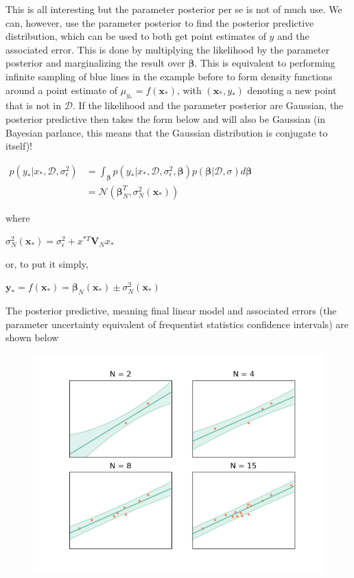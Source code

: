 \documentclass[]{article}
\begin{document}
This is all interesting but the parameter posterior per se is not of much use. We can, however, use the parameter posterior to find the posterior predictive distribution, which can be used to both get point estimates of $y$ and the associated error. This is done by multiplying the likelihood by the parameter posterior and marginalizing the result over $\boldsymbol{\beta}$. This is equivalent to performing infinite sampling of blue lines in the example before to form density functions around a point estimate of $\mu_{y_*}=f(\boldsymbol{x}_*)$, with $(\boldsymbol{x}_*,y_*)$ denoting a new point that is not in $\mathcal{D}$. If the likelihood and the parameter posterior are Gaussian, the posterior predictive then takes the form below and will also be Gaussian (in Bayesian parlance, this means that the Gaussian distribution is conjugate to itself)!

$\begin{aligned}p(y_*|x_*,\mathcal{D}, \sigma_{\epsilon}^2) &= \int_{\boldsymbol{\beta}}p(y_*|x_*,\mathcal{D}, \sigma_{\epsilon}^2,\boldsymbol{\beta})p(\boldsymbol{\beta}|\mathcal{D}, \sigma)d\boldsymbol{\beta}\\

&=\mathcal{N}(\boldsymbol{\beta}_N^T, \sigma_N^2(\boldsymbol{x}_*))\end{aligned}$

where

$\sigma_N^2(\boldsymbol{x}_*) = \sigma_{\epsilon}^2 + x^{*T}\boldsymbol{V}_Nx_*$

or, to put it simply,

$\boldsymbol{y}_* = f(\boldsymbol{x}_*) = \boldsymbol{\beta}_N(\boldsymbol{x}_*) \pm \sigma_N^2(\boldsymbol{x}_*)$

The posterior predictive, meaning final linear model and associated errors (the parameter uncertainty equivalent of frequentist statistics confidence intervals) are shown below

\begin{figure}
	\centering
	\includegraphics[width=0.9\linewidth]{linear_regression.png}
	\label{fig:linearregression}
\end{figure}
\end{document}
